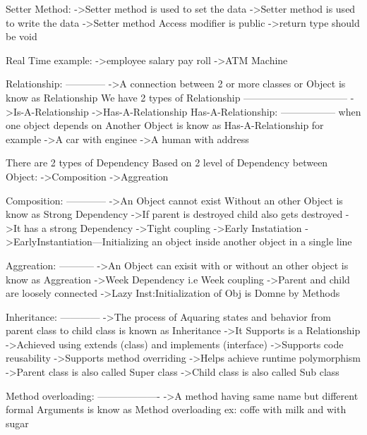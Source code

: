       Setter Method:
               ->Setter method is used to set the data
               ->Setter method is used to write the data
               ->Setter method Access modifier is public
               ->return type should be void


         Real Time example:
                     ->employee salary pay roll
                     ->ATM Machine

Relationship:
------------
         ->A connection between 2 or more classes or Object is know as Relationship
      We have 2 types of Relationship
      --------------------------------
                     ->Is-A-Relationship
                     ->Has-A-Relationship
      Has-A-Relationship:
      -----------------
                  when one object depends on Another Object is know as Has-A-Relationship
                  for example
                        ->A car with enginee
                        ->A human with address

      There are 2 types of Dependency Based on 2 level of Dependency between Object:
                     ->Composition
                     ->Aggreation

      Composition:
      ------------
               ->An Object cannot exist Without an other Object is know as Strong Dependency
               ->If parent is destroyed child also gets destroyed
               ->It has a strong Dependency
               ->Tight coupling
               ->Early Instatiation
               ->EarlyInstantiation---Initializing an object inside another object in a single line

      Aggreation:
      -----------
               ->An Object can exisit with or without an other object is know as Aggreation
               ->Week Dependency i.e Week coupling
               ->Parent and child are loosely connected
               ->Lazy Inst:Initialization of Obj is Domne by Methods

Inheritance:
------------
            ->The process of Aquaring states and behavior from parent class to child class is known as Inheritance
            ->It Supports is a Relationship
            ->Achieved using extends (class) and implements (interface)
            ->Supports code reusability
            ->Supports method overriding
            ->Helps achieve runtime polymorphism
            ->Parent class is also called Super class
            ->Child class is also called Sub class

   Method overloading:
   -------------------
               ->A method having same name but different formal Arguments is know as Method overloading
               ex: coffe with milk and with sugar

